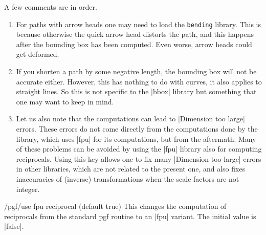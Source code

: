 A few comments are in order. 
\begin{enumerate}
\item For paths with arrow heads one may need to load the \texttt{bending}
 library. This is because otherwise the quick arrow head distorts the path, and
 this happens after the bounding box has been computed. Even worse, arrow heads
 could get deformed.
\item If you shorten a path by some negative length, the bounding box will not
 be accurate either. However, this has nothing to do with curves, it also
 applies to straight lines. So this is not specific to the |bbox| library but
 something that one may want to keep in mind.
\item Let us also note that the computations can lead to |Dimension too large|
 errors. These errors do not come directly from the computations done by the
 library, which uses |fpu| for its computations, but from the aftermath. Many of
 these problems can be avoided by using the |fpu| library also for computing
 reciprocals. Using this key allows one to fix many |Dimension too large| errors
 in  other libraries, which are not related to the present one, and also fixes
 inaccuracies of (inverse) transformations when the scale factors are not
 integer.
\end{enumerate}

\begin{key}{/pgf/use fpu reciprocal (default true)}
  This changes the computation of reciprocals from the standard pgf routine to
  an |fpu| variant. The initial value is |false|.
\end{key}

\endinput


